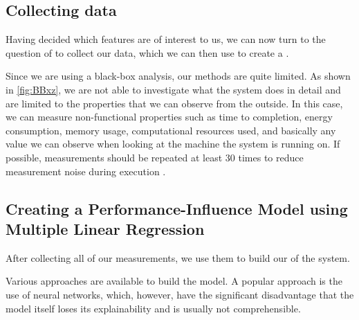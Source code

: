 


\subsection{Collecting data}
Having decided which features are of interest to us, we can now turn to the question of to collect our data,
which we can then use to create a \perfInfluenceModel.

Since we are using a black-box analysis, our methods are quite limited. As shown in \autoref{fig:BBxz}, we are not able to investigate what the system does 
in detail and are limited to the properties that we can observe from the outside. 
In this case, we can measure non-functional properties such as time to completion, energy consumption, memory usage, 
computational resources used, and basically any value we can observe when looking at the machine the system is running on. 
If possible, measurements should be repeated at least 30 times to reduce measurement noise during execution \cite{SampleSize}.


\subsection{Creating a Performance-Influence Model using Multiple Linear Regression}
After collecting all of our measurements, we use them to build our \perfInfluenceModel of the system. 

Various approaches are available to build the model.
A popular approach is the use of neural networks, which, however, 
have the significant disadvantage that the model itself loses its explainability and is usually not comprehensible.

